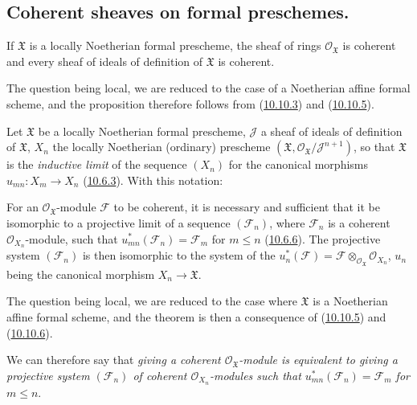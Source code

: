 \subsection{Coherent sheaves on formal preschemes.}
\label{subsection:I.10.11}

\begin{proposition}[10.11.1]
\label{I.10.11.1}
If $\mathfrak{X}$ is a locally Noetherian formal prescheme, the
sheaf of rings $\mathscr{O}_{\mathfrak{X}}$ is coherent and every
sheaf of ideals of definition of $\mathfrak{X}$ is coherent.
\end{proposition}

The question being local, we are reduced to the case of a Noetherian
affine formal scheme, and the proposition therefore follows from
(\hyperref[I.10.10.3]{10.10.3}) and
(\hyperref[I.10.10.5]{10.10.5}).

\begin{env}[10.11.2]
\label{I.10.11.2}
Let $\mathfrak{X}$ be a locally Noetherian formal prescheme,
$\mathscr{J}$ a sheaf of ideals of definition of $\mathfrak{X}$,
$X_n$ the locally Noetherian (ordinary) prescheme
$(\mathfrak{X},\mathscr{O}_{\mathfrak{X}}/\mathscr{J}^{n+1})$, so
that $\mathfrak{X}$ is the \emph{inductive limit} of the sequence $(X_n)$ for
the canonical morphisms $u_{mn}:X_m\to X_n$
(\hyperref[I.10.6.3]{10.6.3}). With this notation:
\end{env}

\begin{theorem}[10.11.3]
\label{I.10.11.3}
For an $\mathscr{O}_{\mathfrak{X}}$-module $\mathscr{F}$ to be
coherent, it is necessary and sufficient that it be isomorphic to a
projective limit of a sequence $(\mathscr{F}_n)$, where $\mathscr{F}_n$ is a
coherent $\mathscr{O}_{X_n}$-module, such that
$u_{mn}^*(\mathscr{F}_n)=\mathscr{F}_m$ for $m\leq n$
\textup{(\hyperref[I.10.6.6]{10.6.6})}. The projective system
$(\mathscr{F}_n)$ is then isomorphic to the system of the
$u_n^*(\mathscr{F})=\mathscr{F}
\otimes_{\mathscr{O}_{\mathfrak{X}}}\mathscr{O}_{X_n}$, $u_n$ being
the canonical morphism $X_n\to\mathfrak{X}$.
\end{theorem}

The question being local, we are reduced to the case where $\mathfrak{X}$ is
a Noetherian affine formal scheme, and the theorem is then a consequence
of (\hyperref[I.10.10.5]{10.10.5}) and
(\hyperref[I.10.10.6]{10.10.6}).

We can therefore say that \emph{giving a coherent
$\mathscr{O}_{\mathfrak{X}}$-module is equivalent to giving a
projective system $(\mathscr{F}_n)$ of
coherent $\mathscr{O}_{X_n}$-modules such that
$u_{mn}^*(\mathscr{F}_n)=\mathscr{F}_m$ for $m\leq n$}.

